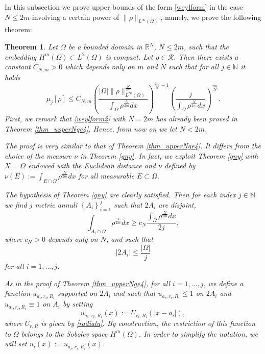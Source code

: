 \documentclass[11pt,a4paper]{amsart}
\numberwithin{equation}{section}
\newtheorem{thm}[equation]{Theorem}
\begin{document}
In this subsection we prove upper bounds of the form \eqref{weylform} in the case $N\leq 2m$ involving a certain power of $\|\rho\|_{L^{\infty}(\Omega)}$, namely, we prove the following theorem:
\begin{thm}\label{weylboundsthm}
Let $\Omega$ be a bounded domain in $\mathbb R^N$, $N\leq 2m$, such that the embedding $H^m(\Omega)\subset L^2(\Omega)$ is compact. Let $\rho\in\mathcal R$. Then there exists a constant $C_{N,m}>0$ which depends only on $m$ and $N$ such that for all $j\in\mathbb N$ it holds
\begin{equation}\label{weylform2}
\mu_j[\rho]\leq C_{N,m}\left(\frac{|\Omega|\|\rho\|_{L^{\infty}(\Omega)}^{\frac{N}{2m}}}{\int_{\Omega}\rho^{\frac{N}{2m}}dx}\right)^{\frac{2m}{N}-1}\left(\frac{j}{\int_{\Omega}\rho^{\frac{N}{2m}}dx}\right)^{\frac{2m}{N}}.
\end{equation}
\proof
First, we remark that \eqref{weylform2} with $N=2m$ has already been proved in Theorem \ref{thm_upperNge4}. Hence, from now on we let $N<2m$.

The proof is very similar to that of Theorem \ref{thm_upperNge4}. It differs from the choice of the measure $\nu$ in Theorem \ref{gny}. In fact, we exploit Theorem \ref{gny} with $X=\Omega$ endowed with the Euclidean distance and $\nu$ defined by $\nu(E):=\int_{E\cap\Omega}\rho^{\frac{N}{2m}}dx$ for all measurable $E\subset\Omega$.


The hypothesis of Theorem \ref{gny} are clearly satisfied. Then for each index $j\in\mathbb N$ we find $j$ metric annuli $\left\{A_i\right\}_{i=1}^{j}$ such that $2A_i$ are disjoint,
\begin{equation*}
\int_{A_i\cap\Omega}\rho^{\frac{N}{2m}} dx\geq c_N\frac{\int_{\Omega}\rho^{\frac{N}{2m}} dx}{2j},
\end{equation*}
where $c_N>0$ depends only on $N$, and such that
\begin{equation}\label{choice2}
|2A_{i}|\leq\frac{|\Omega|}{j}
\end{equation}
for all $i=1,...,j$.

As in the proof of Theorem \ref{thm_upperNge4}, for all $i=1,...,j$, we define a function $u_{a_{i},r_{i},R_{i}}$ supported on $2A_{i}$ and such that $u_{a_{i},r_{i},R_{i}}\leq 1$ on $2A_{i}$ and $u_{a_{i},r_{i},R_{i}}\equiv 1$ on $A_{i}$ by setting
\begin{equation*}
u_{a_{i},r_{i},R_{i}}(x):=U_{r_{i},R_{i}}(|x-a_{i}|),
\end{equation*}
where $U_{r,R}$ is given by \eqref{radialu}. By construction, the restriction of this function to $\Omega$  belongs to the Sobolev space $H^m(\Omega)$. In order to simplify the notation, we will set $u_{i}(x):=u_{a_{i},r_{i},R_{i}}(x)$.


\end{thm}
\end{document}
